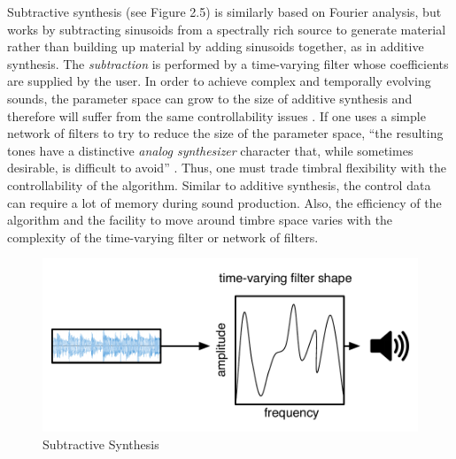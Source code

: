 \documentclass[a4paper,12pt]{report} 	%
\numberwithin{figure}{chapter}
\numberwithin{table}{chapter}
\numberwithin{equation}{chapter}
\begin{document}
\begin{flushleft}
Subtractive synthesis (see Figure 2.5) is similarly based on Fourier analysis, but works by subtracting sinusoids from a spectrally rich source to generate material rather than building up material by adding sinusoids together, as in additive synthesis. The \emph{subtraction} is performed by a time-varying filter whose coefficients are supplied by the user. In order to achieve complex and temporally evolving sounds, the parameter space can grow to the size of additive synthesis and therefore will suffer from the same controllability issues \cite[p. 48]{Tolonen:1998bh}. If one uses a simple network of filters to try to reduce the size of the parameter space, ``the resulting tones have a distinctive \emph{analog synthesizer} character that, while sometimes desirable, is difficult to avoid'' \cite[p. 5]{Vercoe:1998hh}. Thus, one must trade timbral flexibility with the controllability of the algorithm. Similar to additive synthesis, the control data can require a lot of memory during sound production. Also, the efficiency of the algorithm and the facility to move around timbre space varies with the complexity of the time-varying filter or network of filters.
\\
\begin{figure}[h!]
\begin{center}
\includegraphics[scale=0.8]{SubtractiveSynthesis}
\caption[Subtractive Synthesis]{Subtractive Synthesis}
\end{center}
\end{figure}

\end{flushleft}
\end{document}
